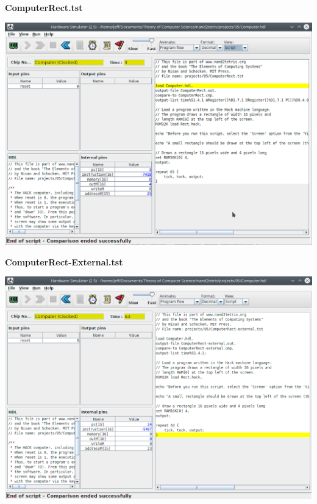 \documentclass[titlepage]{article}
\begin{document}
\begin{description}
{    \textbf{ComputerRect.tst}

    \includegraphics[width=.9\textwidth]{computer-rect.png}

    \textbf{ComputerRect-External.tst}

    \includegraphics[width=.9\textwidth]{computer-rect-external.png}
  }
\end{description}
\end{document}
